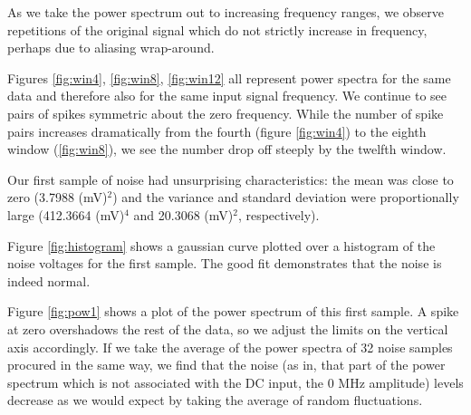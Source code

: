 \documentclass[a4paper]{article}
\begin{document}
As we take the power spectrum out to increasing frequency ranges, we observe repetitions of the original signal which do not strictly increase in frequency, perhaps due to aliasing wrap-around.

Figures \ref{fig:win4}, \ref{fig:win8}, \ref{fig:win12} all represent power spectra for the same data and therefore also for the same input signal frequency. We continue to see pairs of spikes symmetric about the zero frequency. While the number of spike pairs increases dramatically from the fourth (figure \ref{fig:win4}) to the eighth window (\ref{fig:win8}), we see the number drop off steeply by the twelfth window. %



Our first sample of noise had unsurprising characteristics: the mean was close to zero (3.7988 (mV)$^2$) and the variance and standard deviation were proportionally large (412.3664 (mV)$^4$ and 20.3068 (mV)$^2$, respectively).

Figure \ref{fig:histogram} shows a gaussian curve plotted over a histogram of the noise voltages for the first sample. The good fit demonstrates that the noise is indeed normal.

Figure \ref{fig:pow1} shows a plot of the power spectrum of this first sample. A spike at zero overshadows the rest of the data, so we adjust the limits on the vertical axis accordingly. If we take the average of the power spectra of 32 noise samples procured in the same way, we find that the noise (as in, that part of the power spectrum which is not associated with the DC input, the 0 MHz amplitude) levels decrease as we would expect by taking the average of random fluctuations.
\end{document}

